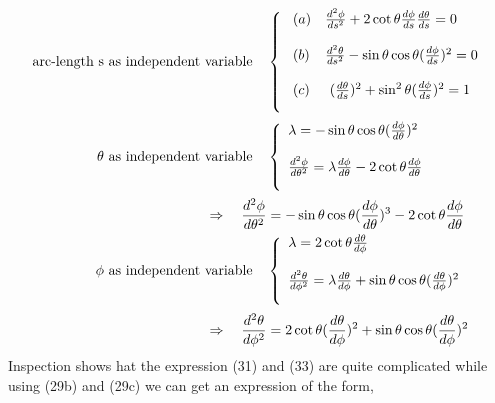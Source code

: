 \begin{align}
\text{arc-length s as independent variable}\quad& \left \{ \begin{array}{ll}
\ (a)&\dv[2]{\phi}{s} + 2 \cot\theta\dv{\phi}{s} \dv{\theta}{s} = 0\\\\
\ (b)&\dv[2]{\theta}{s} - \sin\theta\cos\theta(\dv{\phi}{s})^2  = 0\\\\
\ (c)&\ (\dv{\theta}{s})^2+\sin^2\theta(\dv{\phi}{s})^2 = 1\\\\
\end{array}\right.\\
\theta \text{ as independent variable}\quad& \left \{ \begin{array}{l}
\lambda =  - \sin\theta\cos\theta(\dv{\phi}{\theta})^2\\\\
\dv[2]{\phi}{\theta}  = \lambda \dv{\phi}{\theta}- 2 \cot\theta\dv{\phi}{\theta}  \\\\
\end{array}\right.\\
\Rightarrow \quad \dv[2]{\phi}{\theta}  &= - \sin\theta\cos\theta(\dv{\phi}{\theta})^3- 2 \cot\theta\dv{\phi}{\theta}  \\
\phi \text{ as independent variable}\quad& \left \{ \begin{array}{l}
\lambda =  2 \cot\theta\dv{\theta}{\phi}\\\\
\dv[2]{\theta}{\phi}  = \lambda \dv{\theta}{\phi} + \sin\theta\cos\theta(\dv{\theta}{\phi})^2 \\\\
\end{array}\right.\\
\Rightarrow \quad \dv[2]{\theta}{\phi}  &= 2 \cot\theta(\dv{\theta}{\phi})^2 + \sin\theta\cos\theta(\dv{\theta}{\phi})^2 
\
\end{align}
Inspection shows hat the expression (31) and (33) are quite complicated while using (29b) and (29c) we can get an expression of the form,
